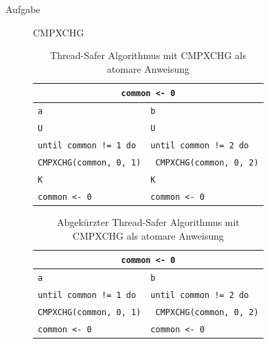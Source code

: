 \documentclass[a4paper,twoside,12pt,fleqn]{article}
\newcounter{AUFGNR}
\newcommand{\AUFGABE}[2]{\vspace{0.3cm}\item[Aufgabe~\arabic{AUFGNR}]\stepcounter{AUFGNR} #1\hfill\emph{#2}}
\begin{document}
\begin{description}
	\AUFGABE{CMPXCHG}{}
	\begin{table}[h]
		\centering
		\begin{tabularx}{0.75\textwidth}{l | l}
			\multicolumn{2}{c}{\texttt{common <- 0}}                                                 \\
			\hline
			\texttt{a}                                 & \texttt{b}                                  \\
			\hline
			\texttt{U}                                 & \texttt{U}                                  \\
			\texttt{until common != 1 do}              & \texttt{until common != 2 do}               \\
			\texttt{\hspace{2em}CMPXCHG(common, 0, 1)} & \texttt{\hspace{2em} CMPXCHG(common, 0, 2)} \\
			\texttt{K}                                 & \texttt{K}                                  \\
			\texttt{common <- 0}                       & \texttt{common <- 0}                        \\
		\end{tabularx}
		\caption{Thread-Safer Algorithmus mit CMPXCHG als atomare Anweisung}
	\end{table}

	\begin{table}[h]
		\centering
		\begin{tabularx}{0.75\textwidth}{l | l}
			\multicolumn{2}{c}{\texttt{common <- 0}}                                                 \\
			\hline
			\texttt{a}                                 & \texttt{b}                                  \\
			\hline
			\texttt{until common != 1 do}              & \texttt{until common != 2 do}               \\
			\texttt{\hspace{2em}CMPXCHG(common, 0, 1)} & \texttt{\hspace{2em} CMPXCHG(common, 0, 2)} \\
			\texttt{common <- 0}                       & \texttt{common <- 0}                        \\
		\end{tabularx}
		\caption{Abgekürzter Thread-Safer Algorithmus mit CMPXCHG als atomare Anweisung}
	\end{table}


\end{description}
\end{document}
